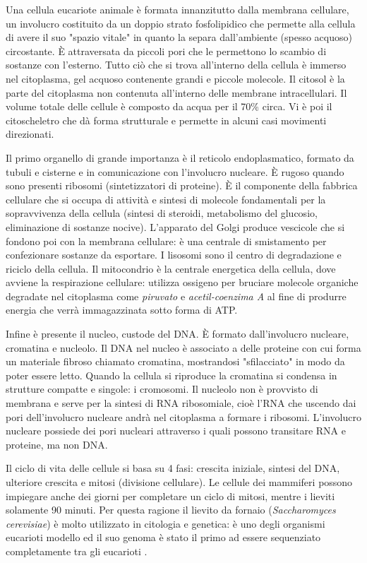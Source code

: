 Una cellula eucariote animale è formata innanzitutto dalla membrana cellulare, un involucro costituito da un doppio strato fosfolipidico che permette alla cellula di avere il suo "spazio vitale" in quanto la separa dall'ambiente (spesso acquoso) circostante. È attraversata da piccoli pori che le permettono lo scambio di sostanze con l'esterno. Tutto ciò che si trova all'interno della cellula è immerso nel citoplasma, gel acquoso contenente grandi e piccole molecole. Il citosol è la parte del citoplasma non contenuta all'interno delle membrane intracellulari. Il volume totale delle cellule è composto da acqua per il 70\% circa. Vi è poi il citoscheletro che dà forma strutturale e permette in alcuni casi movimenti direzionati. 

\par Il primo organello di grande importanza è il reticolo endoplasmatico, formato da tubuli e cisterne e in comunicazione con l'involucro nucleare. È rugoso quando sono presenti ribosomi (sintetizzatori di proteine). È il componente della fabbrica cellulare che si occupa di attività e sintesi di molecole fondamentali per la sopravvivenza della cellula (sintesi di steroidi, metabolismo del glucosio, eliminazione di sostanze nocive). L'apparato del Golgi produce vescicole che si fondono poi con la membrana cellulare: è una centrale di smistamento per confezionare sostanze da esportare. I lisosomi sono il centro di degradazione e riciclo della cellula. Il mitocondrio è la centrale energetica della cellula, dove avviene la respirazione cellulare: utilizza ossigeno per bruciare molecole organiche degradate nel citoplasma come \textit{piruvato} e \textit{acetil-coenzima A} al fine di produrre energia che verrà immagazzinata sotto forma di ATP.

\par Infine è presente il nucleo, custode del DNA. È formato dall'involucro nucleare, cromatina e nucleolo. Il DNA nel nucleo è associato a delle proteine con cui forma un materiale fibroso chiamato cromatina, mostrandosi "sfilacciato" in modo da poter essere letto. Quando la cellula si riproduce la cromatina si condensa in strutture compatte e singole: i cromosomi. Il nucleolo non è provvisto di membrana e serve per la sintesi di RNA ribosomiale, cioè l'RNA che uscendo dai pori dell'involucro nucleare andrà nel citoplasma a formare i ribosomi. L'involucro nucleare possiede dei pori nucleari attraverso i quali possono transitare RNA e proteine, ma non DNA.

\par Il ciclo di vita delle cellule si basa su 4 fasi: crescita iniziale, sintesi del DNA, ulteriore crescita e mitosi (divisione cellulare). Le cellule dei mammiferi possono impiegare anche dei giorni per completare un ciclo di mitosi, mentre i lieviti solamente 90 minuti. Per questa ragione il lievito da fornaio (\textit{Saccharomyces cerevisiae}) è molto utilizzato in citologia e genetica: è uno degli organismi eucarioti modello\supercite{alberts2018essential} ed il suo genoma è stato il primo ad essere sequenziato completamente tra gli eucarioti \supercite{lievitoWiki}.

